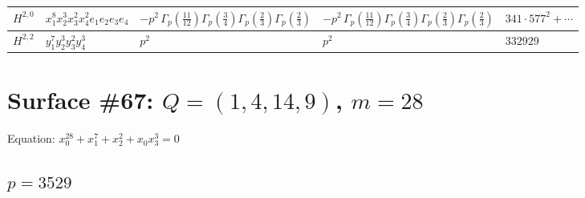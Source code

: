 \documentclass[11pt]{article}
\begin{document}
\begin{table}[ht]
{\begin{tabular}{@{}lllll@{}}
\midrule
$H^{2,0}$ & $x_{1}^{8} x_{2}^{3} x_{3}^{2} x_{4}^{2}  e_{1} e_{2} e_{3} e_{4}$ & $- p^{2} \, \Gamma_p \left( \frac{11}{12} \right) \Gamma_p \left( \frac{3}{4} \right) \Gamma_p \left( \frac{2}{3} \right) \Gamma_p \left( \frac{2}{3} \right)$ & $- p^{2} \, \Gamma_p \left( \frac{11}{12} \right) \Gamma_p \left( \frac{3}{4} \right) \Gamma_p \left( \frac{2}{3} \right) \Gamma_p \left( \frac{2}{3} \right)$ & $341{\cdot}577^{2}{+}\cdots$ \\
\midrule
$H^{2,2}$ & $y_{1}^{7} y_{2}^{3} y_{3}^{2} y_{4}^{3}$ & $p^{2} \,$ & $p^{2} \,$ & $332929$ \\
\bottomrule
\end{tabular}
}
\renewcommand{\arraystretch}{1.0}
\end{table}

\newpage

\section*{Surface \#67: $Q=(1, 4, 14, 9)$, $m=28$}

Equation: $x_0^{28} + x_1^{7} + x_2^{2} + x_0 x_3^{3} = 0$

\subsection*{$p = 3529$}
\end{document}
